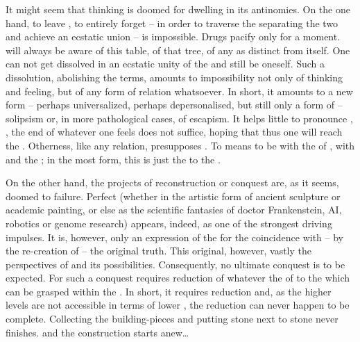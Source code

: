 It might seem that  thinking is doomed for dwelling in
its antinomies. On the one hand, to leave , to entirely forget
 -- in order to traverse the  separating the two and
achieve an ecstatic union -- is impossible. Drugs
pacify only for a moment.  will always be aware
of this table, of that tree, of any  as distinct from itself.
One can not get dissolved in an ecstatic unity of the  and still
be oneself. Such a dissolution, abolishing the  terms, amounts to
impossibility not only of thinking and feeling, but of any form of relation
whatsoever. In short, it amounts to a new form -- perhaps universalized, perhaps
depersonalised, but still only a form of -- solipsism or, in more pathological
cases, of escapism. It helps little to pronounce ,
, the end of whatever one feels does not
suffice, hoping that thus one will reach the . Otherness, like
any relation, presupposes . To  means to be
 with the  of , with 
and the ; in the most  form, this 
is just the  to the .

On the other hand, the projects of  reconstruction or conquest
are, as it seems, doomed to failure. Perfect  (whether in the
artistic form of ancient sculpture or academic painting, or else as the
scientific fantasies of doctor Frankenstein, AI, robotics or genome research)
appears, indeed, as one of the strongest driving impulses. It is, however, only
an expression of the  for the coincidence with -- by the
re-creation of -- the original truth. This original, however, vastly
 the perspectives of  and its
possibilities. Consequently, no ultimate conquest is to be expected. For such a
conquest requires reduction of whatever  the  of
 to the  which can be grasped
within the \hoa. In short, it requires reduction and, as the higher levels are
not accessible in terms of lower , the reduction can never
happen to be complete.  Collecting the building-pieces and putting stone next to
stone never finishes.   and the construction
starts anew\ldots

